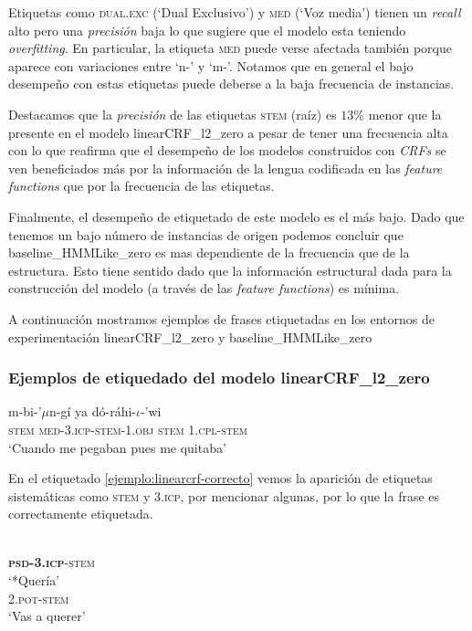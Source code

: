 \documentclass[letterpaper,12pt,oneside]{book}
\theoremstyle{definition}
\begin{document}
Etiquetas como \textsc{dual.exc} (`Dual Exclusivo') y \textsc{med} (`Voz media') tienen un \textit{recall} alto pero una \textit{precisión} baja lo que sugiere que el modelo esta teniendo \textit{overfitting}. En particular, la etiqueta \textsc{med} puede verse afectada también porque aparece con variaciones entre `n-' y `m-'. Notamos que en general el bajo desempeño con estas etiquetas puede deberse a la baja frecuencia de instancias. 

Destacamos que la \textit{precisión} de las etiquetas \textsc{stem} (raíz) es $13\%$ menor que la presente en el modelo \textsf{linearCRF\_l2\_zero} a pesar de tener una frecuencia alta con lo que reafirma que el desempeño de los modelos construidos con \textit{CRFs} se ven beneficiados más por la información de la lengua codificada en las \textit{feature functions} que por la frecuencia de las etiquetas.

Finalmente, el desempeño de etiquetado de este modelo es el más bajo. Dado que tenemos un bajo número de instancias de origen podemos concluir que \textsf{baseline\_HMMLike\_zero} es mas dependiente de la frecuencia que de la estructura. Esto tiene sentido dado que la información estructural dada para la construcción del modelo (a través de las \textit{feature functions}) es mínima.

A continuación mostramos ejemplos de frases etiquetadas en los entornos de experimentación \textsf{linearCRF\_l2\_zero} y \textsf{baseline\_HMMLike\_zero}

\subsubsection{Ejemplos de etiquedado del modelo \textsf{linearCRF\_l2\_zero}}

\begin{exe}
    \ex {} {m-bi-'$\mu$n-gí} {ya} {dó-ráhi-$\iota$-'wi}\\
    {\textsc{stem}} {\textsc{med-3.icp-stem-1.obj}} {\textsc{stem}} {\textsc{1.cpl-stem}}\\
    \trans `Cuando me pegaban pues me quitaba' \label{ejemplo:linearcrf-correcto}
\end{exe}

En el etiquetado \ref{ejemplo:linearcrf-correcto} vemos la aparición de etiquetas sistemáticas como \textsc{stem} y \textsc{3.icp}, por mencionar algunas, por lo que la frase es correctamente etiquetada.

\begin{exe}
\ex \begin{xlist}
    \ex {}\\
    {\textbf{\textsc{psd-3.icp}}-\textsc{stem}}\\
    \trans `*Quería' \label{ejemplo:linearcrf-incorrecto-a}
    \ex {}\\
    {\textsc{2.pot-stem}}\\
    \trans `Vas a querer'\label{ejemplo:linearcrf-correcto-b}
    \end{xlist}
\end{exe}
\end{document}
